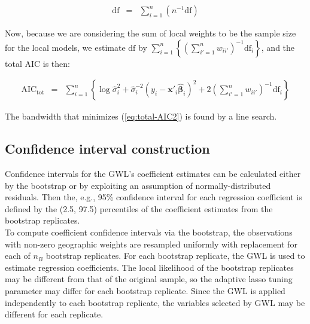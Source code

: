 \documentclass[authoryear, review, 11pt]{elsarticle}
\begin{document}
			
	\begin{eqnarray}
		\mbox{df} &=& \sum_{i=1}^n \left( n^{-1} \mbox{df} \right)
	\end{eqnarray}
	
	Now, because we are considering the sum of local weights to be the sample size for the local models, we estimate $\mbox{df}$ by $\sum_{i=1}^n \left\{ \left(\sum_{i'=1}^n w_{ii'} \right)^{-1} \mbox{df}_i \right\}$, and the total AIC is then:
	
	\begin{eqnarray}\label{eq:total-AIC2}
		\mbox{AIC}_{\mbox{tot}} &=& \sum_{i=1}^n \left\{ \log \hat{\sigma}_i^2 + \hat{\sigma}_i^{-2} \left(y_i - \bm{x}'_i \hat{\bm{\beta}}_i \right)^2 + 2 \left(\sum_{i'=1}^n w_{ii'} \right)^{-1} \mbox{df}_i \right\}
	\end{eqnarray}
			
	The bandwidth that minimizes (\ref{eq:total-AIC2}) is found by a line search.\\
	
	\subsection{Confidence interval construction}	
	Confidence intervals for the GWL's coefficient estimates can be calculated either by the bootstrap \citep{Efron:1986} or by exploiting an assumption of normally-distributed residuals. Then the, e.g., 95\% confidence interval for each regression coefficient is defined by the (2.5, 97.5) percentiles of the coefficient estimates from the bootstrap replicates.\\
	 
	 	To compute coefficient confidence intervals via the bootstrap, the observations with non-zero geographic weights are resampled uniformly with replacement for each of $n_B$ bootstrap replicates. For each bootstrap replicate, the GWL is used to estimate regression coefficients. The local likelihood of the bootstrap replicates may be different from that of the original sample, so the adaptive lasso tuning parameter may differ for each bootstrap replicate. Since the GWL is applied independently to each bootstrap replicate, the variables selected by GWL may be different for each replicate.\\
	
\end{document}
